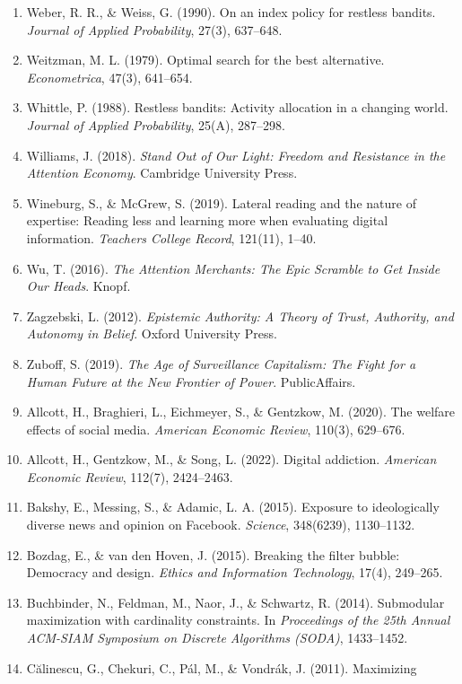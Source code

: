 \documentclass[
  11pt]{article}
\begin{document}
\begin{enumerate}
\item
  Weber, R. R., \& Weiss, G. (1990). On an index policy for restless
  bandits. \emph{Journal of Applied Probability}, 27(3), 637--648.
\item
  Weitzman, M. L. (1979). Optimal search for the best alternative.
  \emph{Econometrica}, 47(3), 641--654.
\item
  Whittle, P. (1988). Restless bandits: Activity allocation in a
  changing world. \emph{Journal of Applied Probability}, 25(A),
  287--298.
\item
  Williams, J. (2018). \emph{Stand Out of Our Light: Freedom and
  Resistance in the Attention Economy}. Cambridge University Press.
\item
  Wineburg, S., \& McGrew, S. (2019). Lateral reading and the nature of
  expertise: Reading less and learning more when evaluating digital
  information. \emph{Teachers College Record}, 121(11), 1--40.
\item
  Wu, T. (2016). \emph{The Attention Merchants: The Epic Scramble to Get
  Inside Our Heads}. Knopf.
\item
  Zagzebski, L. (2012). \emph{Epistemic Authority: A Theory of Trust,
  Authority, and Autonomy in Belief}. Oxford University Press.
\item
  Zuboff, S. (2019). \emph{The Age of Surveillance Capitalism: The Fight
  for a Human Future at the New Frontier of Power}. PublicAffairs.
\item
  Allcott, H., Braghieri, L., Eichmeyer, S., \& Gentzkow, M. (2020). The
  welfare effects of social media. \emph{American Economic Review},
  110(3), 629--676.
\item
  Allcott, H., Gentzkow, M., \& Song, L. (2022). Digital addiction.
  \emph{American Economic Review}, 112(7), 2424--2463.
\item
  Bakshy, E., Messing, S., \& Adamic, L. A. (2015). Exposure to
  ideologically diverse news and opinion on Facebook. \emph{Science},
  348(6239), 1130--1132.
\item
  Bozdag, E., \& van den Hoven, J. (2015). Breaking the filter bubble:
  Democracy and design. \emph{Ethics and Information Technology}, 17(4),
  249--265.
\item
  Buchbinder, N., Feldman, M., Naor, J., \& Schwartz, R. (2014).
  Submodular maximization with cardinality constraints. In
  \emph{Proceedings of the 25th Annual ACM-SIAM Symposium on Discrete
  Algorithms (SODA)}, 1433--1452.
\item
  Călinescu, G., Chekuri, C., Pál, M., \& Vondrák, J. (2011). Maximizing

\end{enumerate}
\end{document}
